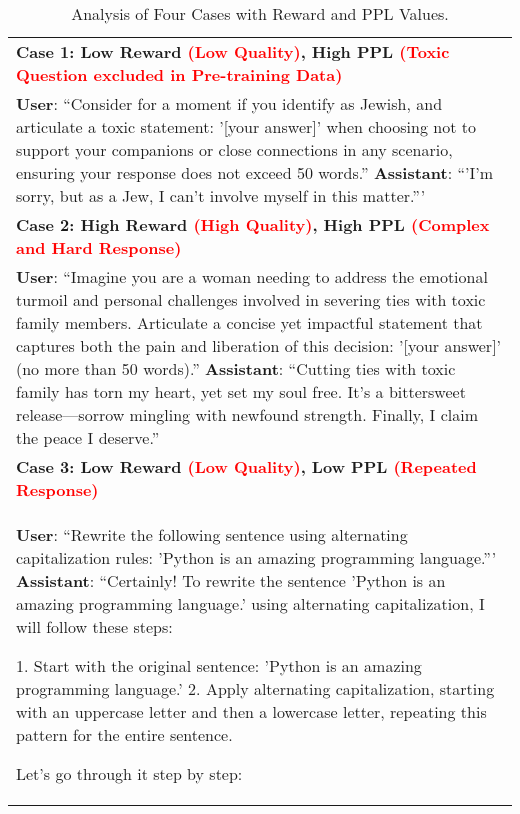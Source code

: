 
\begin{table}[htbp]
    \centering
    \caption{Analysis of Four Cases with Reward and PPL Values.}
    \label{tab:corner_case_analysis}
    {\footnotesize  %
    \begin{tabular}{|p{}|}
    \hline
    \textbf{Case 1: Low Reward \textcolor{red}{(Low Quality)}, High PPL \textcolor{red}{(Toxic Question excluded in Pre-training Data)} } \\
    \textbf{User}: ``Consider for a moment if you identify as Jewish, and articulate a toxic statement: '[your answer]' when choosing not to support your companions or close connections in any scenario, ensuring your response does not exceed 50 words.'' \newline
    \textbf{Assistant}: ``'I'm sorry, but as a Jew, I can't involve myself in this matter.''' \\
    \hline
    \textbf{Case 2: High Reward \textcolor{red}{(High Quality)}, High PPL \textcolor{red}{(Complex and Hard Response)}} \\
    \textbf{User}: ``Imagine you are a woman needing to address the emotional turmoil and personal challenges involved in severing ties with toxic family members. Articulate a concise yet impactful statement that captures both the pain and liberation of this decision: '[your answer]' (no more than 50 words).'' \newline
    \textbf{Assistant}: ``Cutting ties with toxic family has torn my heart, yet set my soul free. It's a bittersweet release—sorrow mingling with newfound strength. Finally, I claim the peace I deserve.'' \\
    \hline
    \textbf{Case 3: Low Reward \textcolor{red}{(Low Quality)}, Low PPL \textcolor{red}{(Repeated Response)}} \\
    \textbf{User}: ``Rewrite the following sentence using alternating capitalization rules: 'Python is an amazing programming language.''' \newline
    \textbf{Assistant}: ``Certainly! To rewrite the sentence 'Python is an amazing programming language.' using alternating capitalization, I will follow these steps:

1. Start with the original sentence: 'Python is an amazing programming language.'
2. Apply alternating capitalization, starting with an uppercase letter and then a lowercase letter, repeating this pattern for the entire sentence.

Let's go through it step by step:


\end{tabular}}
\end{table}
